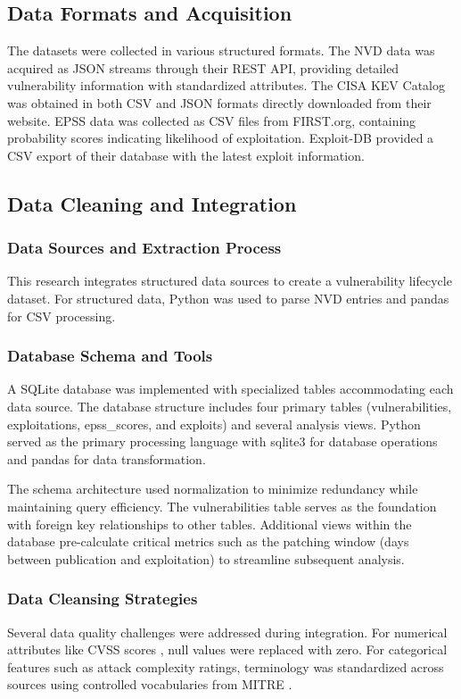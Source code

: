 \documentclass[runningheads]{llncs}
\begin{document}
\subsection{Data Formats and Acquisition}
The datasets were collected in various structured formats. The NVD data was acquired as JSON streams through their REST API, providing detailed vulnerability information with standardized attributes. The CISA KEV Catalog was obtained in both CSV and JSON formats directly downloaded from their website. EPSS data was collected as CSV files from FIRST.org, containing probability scores indicating likelihood of exploitation. Exploit-DB provided a CSV export of their database with the latest exploit information.

\subsection{Data Cleaning and Integration}

\subsubsection{Data Sources and Extraction Process}
This research integrates structured data sources to create a vulnerability lifecycle dataset. For structured data, Python was used to parse NVD entries and pandas for CSV processing.

\subsubsection{Database Schema and Tools}
A SQLite database was implemented with specialized tables accommodating each data source. The database structure includes four primary tables (vulnerabilities, exploitations, epss\_scores, and exploits) and several analysis views. Python served as the primary processing language with sqlite3 for database operations and pandas for data transformation.

The schema architecture used normalization to minimize redundancy while maintaining query efficiency. The vulnerabilities table serves as the foundation with foreign key relationships to other tables. Additional views within the database pre-calculate critical metrics such as the patching window (days between publication and exploitation) to streamline subsequent analysis.

\subsubsection{Data Cleansing Strategies}
Several data quality challenges were addressed during integration. For numerical attributes like CVSS scores \cite{mell2006common}, null values were replaced with zero. For categorical features such as attack complexity ratings, terminology was standardized across sources using controlled vocabularies from MITRE \cite{mitre_cve}.
\end{document}
